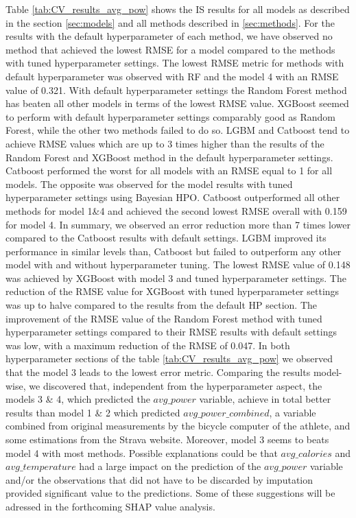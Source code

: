 \documentclass[12pt,a4paper]{article}
\begin{document}
Table \ref{tab:CV_results_avg_pow} shows the IS results for all models as described in the section \ref{sec:models} and all methods described in \ref{sec:methods}. For the results with the default hyperparameter of each method, we have observed no method that achieved the lowest RMSE for a model compared to the methods with tuned hyperparameter settings. The lowest RMSE metric for methods with default hyperparameter was observed with RF and the model 4 with an RMSE value of 0.321. With default hyperparameter settings the Random Forest method has beaten all other models in terms of the lowest RMSE value. XGBoost seemed to perform with default hyperparameter settings comparably good as Random Forest, while the other two methods failed to do so.
LGBM and Catboost tend to achieve RMSE values which are up to 3 times higher than the results of the Random Forest and XGBoost method in the default hyperparameter settings. Catboost performed the worst for all models with an RMSE equal to 1 for all models. The opposite was observed for the model results with tuned hyperparameter settings using Bayesian HPO. Catboost outperformed all other methods for model 1\&4 and achieved the second lowest RMSE overall with 0.159 for model 4. In summary, we observed an error reduction more than 7 times lower compared to the Catboost results with default settings. LGBM improved its performance in similar levels than, Catboost but failed to outperform any other model with and without hyperparameter tuning. The lowest RMSE value of 0.148 was achieved by XGBoost with model 3 and tuned hyperparameter settings. The reduction of the RMSE value for XGBoost with tuned hyperparameter settings was up to halve compared to the results from the default HP section. The improvement of the RMSE value of the Random Forest method with tuned hyperparameter settings compared to their RMSE results with default settings was low, with a maximum reduction of the RMSE of 0.047. In both hyperparameter sections of the table \ref{tab:CV_results_avg_pow} we observed that the model 3 leads to the lowest error metric. Comparing the results model-wise, we discovered that, independent from the hyperparameter aspect, the models 3 \& 4, which predicted the \textit{$avg\_power$} variable, achieve in total better results than model 1 \& 2 which predicted \textit{$avg\_power\_combined$}, a variable combined from original measurements by the bicycle computer of the athlete, and some estimations from the Strava website. Moreover, model 3 seems to beats model 4 with most methods. Possible explanations could be that \textit{$avg\_calories$} and \textit{$avg\_temperature$} had a large impact on the prediction of the \textit{$avg\_power$} variable and/or the observations that did not have to be discarded by imputation provided significant value to the predictions. Some of these suggestions will be adressed in the forthcoming SHAP value analysis.
\end{document}
